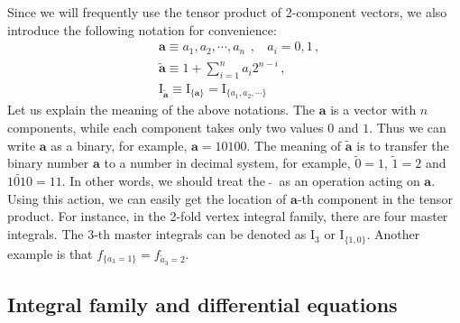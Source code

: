 \documentclass[a4paper,11pt]{article}
\newcommand{\nn}{\nonumber}
\begin{document}
Since we will frequently use the tensor product of 2-component vectors, we also introduce the following notation for convenience: 
\begin{align}
&\bm{a}\equiv a_1,a_2,\cdots,a_n  \,~, ~~~~  a_i = 0,1 \, ,\nn\\
&\tilde{\bm{a}}\equiv1+\sum_{i=1}^n a_i 2^{n-i}  \,, \nn\\
&\text{I}_{\tilde{\bm{a}}}\equiv \text{I}_{\{\bm{a}\}}=\text{I}_{\{a_1,a_2,\cdots\}}\label{eq:defindex}
\end{align}
Let us explain the meaning of the above notations. The $\bm{a}$ is a vector with $n$ components, while each component takes only two values $0$ and $1$. Thus we can write $\bm{a}$ as a binary, for example, $\bm{a}=10100$. The meaning of $\tilde{\bm{a}}$ is to transfer 
the binary number $\bm{a}$ to a number in decimal system, for example, $\tilde{0}=1$, $\tilde{1}=2$ and $\widetilde{1010}=11$. 
In other words, we should treat the $~\widetilde{}~$ as an operation acting on $\bm{a}$. Using this action, we can easily get
the location of $\bm{a}$-th component in the tensor product. 
For instance, in the 2-fold vertex integral family, there are four master integrals. The $3$-th master integrals can be denoted as $\text{I}_{3}$ or $\text{I}_{\{1,0\}}$. Another example is that   $f_{\{a_3=1\}}=f_{\tilde{a}_3=2}$. 


\subsection{Integral family and differential equations}
\end{document}
